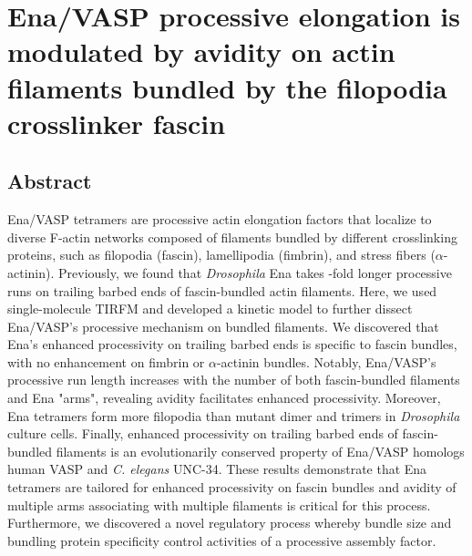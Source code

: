 
\chapter{Ena/VASP processive elongation is modulated by avidity on actin filaments bundled by the filopodia crosslinker fascin}\label{ch:ena}

\section[Abstract]{Abstract\footnotemark}
Ena/VASP tetramers are processive actin elongation factors that localize to diverse F-actin networks composed of filaments bundled by different crosslinking proteins, such as filopodia (fascin), lamellipodia (fimbrin), and stress fibers ($\alpha$-actinin). Previously, we found that \textit{Drosophila} Ena takes -fold longer processive runs on trailing barbed ends of fascin-bundled actin filaments. Here, we used single-molecule TIRFM and developed a kinetic model to further dissect Ena/VASP's processive mechanism on bundled filaments. We discovered that Ena's enhanced processivity on trailing barbed ends is specific to fascin bundles, with no enhancement on fimbrin or $\alpha$-actinin bundles. Notably, Ena/VASP's processive run length increases with the number of both fascin-bundled filaments and Ena "arms", revealing avidity facilitates enhanced processivity. Moreover, Ena tetramers form more filopodia than mutant dimer and trimers in \textit{Drosophila} culture cells. Finally, enhanced processivity on trailing barbed ends of fascin-bundled filaments is an evolutionarily conserved property of Ena/VASP homologs human VASP and \textit{C. elegans} UNC-34. These results demonstrate that Ena tetramers are tailored for enhanced processivity on fascin bundles and avidity of multiple arms associating with multiple filaments is critical for this process. Furthermore, we discovered a novel regulatory process whereby bundle size and bundling protein specificity control activities of a processive assembly factor.


